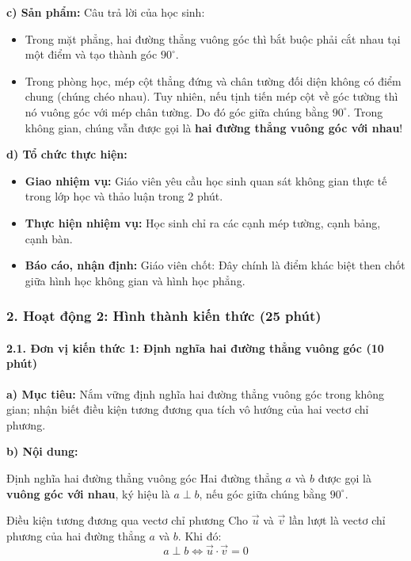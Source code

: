 \documentclass[12pt, a4paper]{article}
\renewcommand{\vec}[1]{\overrightarrow{#1}}
\begin{document}
\noindent \textbf{c) Sản phẩm:}
Câu trả lời của học sinh:
\begin{itemize}
    \item Trong mặt phẳng, hai đường thẳng vuông góc thì bắt buộc phải cắt nhau tại một điểm và tạo thành góc $90^\circ$.
    \item Trong phòng học, mép cột thẳng đứng và chân tường đối diện không có điểm chung (chúng chéo nhau). Tuy nhiên, nếu tịnh tiến mép cột về góc tường thì nó vuông góc với mép chân tường. Do đó góc giữa chúng bằng $90^\circ$. Trong không gian, chúng vẫn được gọi là \textbf{hai đường thẳng vuông góc với nhau}!
\end{itemize}

\noindent \textbf{d) Tổ chức thực hiện:}
\begin{itemize}[leftmargin=0.6cm]
    \item \textbf{Giao nhiệm vụ:} Giáo viên yêu cầu học sinh quan sát không gian thực tế trong lớp học và thảo luận trong 2 phút.
    \item \textbf{Thực hiện nhiệm vụ:} Học sinh chỉ ra các cạnh mép tường, cạnh bảng, cạnh bàn.
    \item \textbf{Báo cáo, nhận định:} Giáo viên chốt: Đây chính là điểm khác biệt then chốt giữa hình học không gian và hình học phẳng.
\end{itemize}

\subsubsection*{2. Hoạt động 2: Hình thành kiến thức (25 phút)}

\paragraph{2.1. Đơn vị kiến thức 1: Định nghĩa hai đường thẳng vuông góc (10 phút)}

\noindent \textbf{a) Mục tiêu:}
Nắm vững định nghĩa hai đường thẳng vuông góc trong không gian; nhận biết điều kiện tương đương qua tích vô hướng của hai vectơ chỉ phương.

\noindent \textbf{b) Nội dung:}
\begin{pedabox}{Định nghĩa hai đường thẳng vuông góc}
Hai đường thẳng $a$ và $b$ được gọi là \textbf{vuông góc với nhau}, ký hiệu là $a \perp b$, nếu góc giữa chúng bằng $90^\circ$.
\end{pedabox}

\begin{pedabox}{Điều kiện tương đương qua vectơ chỉ phương}
Cho $\vec{u}$ và $\vec{v}$ lần lượt là vectơ chỉ phương của hai đường thẳng $a$ và $b$. Khi đó:
$$a \perp b \iff \vec{u} \cdot \vec{v} = 0$$
\end{pedabox}
\end{document}
